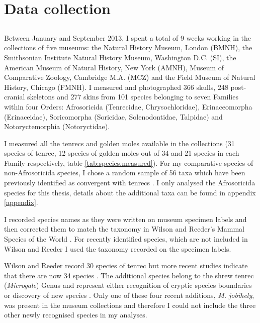 \section{Data collection}
\label{sect:datacollection}


\subsection{}

	Between January and September 2013, I spent a total of 9 weeks working in the collections of five museums: the Natural History Museum, London (BMNH), the Smithsonian Institute Natural History Museum, Washington D.C. (SI), the American Museum of Natural History, New York (AMNH), Museum of Comparative Zoology, Cambridge M.A. (MCZ) and the Field Museum of Natural History, Chicago (FMNH). I measured and photographed 366 skulls, 248 post-cranial skeletons and 277 skins from 101 species belonging to seven Families within four Orders: Afrosoricida (Tenrecidae, Chrysochloridae), Erinaceomorpha (Erinaceidae), Soricomorpha (Soricidae, Solenodontidae, Talpidae) and Notoryctemorphia (Notoryctidae). 

	I measured all the tenrecs and golden moles available in the collections (31 species of tenrec, 12 species of golden moles out of 34 and 21 species in each Family respectively, table \ref{tab:species.measured}). 
	For my comparative species of non-Afrosoricida species, I chose a random sample of 56 taxa which have been previously identified as convergent with tenrecs \citep[e.g.][]{Gould1966, Symonds2005, Poux2008, Olson2013}. I only analysed the Afrosoricida species for this thesis, details about the additional taxa can be found in appendix \ref{appendix}.
	
	I recorded species names as they were written on museum specimen labels and then corrected them to match the taxonomy in Wilson and Reeder's Mammal Species of the World \citeyearpar{Wilson2005}. For recently identified species,  which are not included in Wilson and Reeder \citeyearpar{Wilson2005} I used the taxonomy recorded on the specimen labels.

	Wilson and Reeder \citeyearpar{Wilson2005} record 30 species of tenrec but more recent studies indicate that there are now 34 species \citep[][Table \ref{tab:species.measured}]{Olson2013}. The additional species belong to the shrew tenrec (\textit{Microgale}) Genus and represent either recognition of cryptic species boundaries \citep{Olson2004} or discovery of new species \citep{Goodman2006, Olson2009}. Only one of these four recent additions, \textit{M. jobihely}, was present in the museum collections and therefore I could not include the three other newly recognised species in my analyses.

